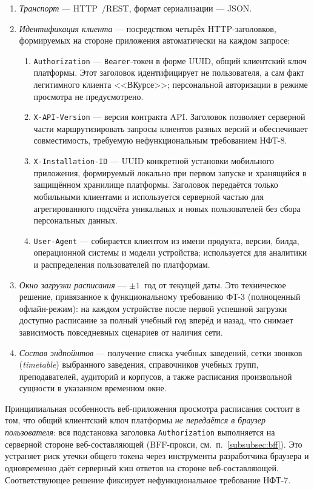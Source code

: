 \begin{enumerate}
  \item \emph{Транспорт} --- HTTP~\cite{rfc-9110}/REST, формат сериализации --- JSON.
  \item \emph{Идентификация клиента} --- посредством четырёх HTTP-заголовков, формируемых на стороне приложения автоматически на каждом запросе:
    \begin{enumerate}
      \item \texttt{Authorization} --- \texttt{Bearer}-токен в форме UUID, общий клиентский ключ платформы. Этот заголовок идентифицирует не пользователя, а сам факт легитимного клиента <<ВКурсе>>; персональной авторизации в режиме просмотра не предусмотрено.
      \item \texttt{X-API-Version} --- версия контракта API. Заголовок позволяет серверной части маршрутизировать запросы клиентов разных версий и обеспечивает совместимость, требуемую нефункциональным требованием НФТ-8.
      \item \texttt{X-Installation-ID} --- UUID конкретной установки мобильного приложения, формируемый локально при первом запуске и хранящийся в защищённом хранилище платформы. Заголовок передаётся только мобильными клиентами и используется серверной частью для агрегированного подсчёта уникальных и новых пользователей без сбора персональных данных.
      \item \texttt{User-Agent} --- собирается клиентом из имени продукта, версии, билда, операционной системы и модели устройства; используется для аналитики и распределения пользователей по платформам.
    \end{enumerate}
  \item \emph{Окно загрузки расписания} --- $\pm 1$~год от текущей даты. Это техническое решение, привязанное к функциональному требованию ФТ-3 (полноценный офлайн-режим): на каждом устройстве после первой успешной загрузки доступно расписание за полный учебный год вперёд и назад, что снимает зависимость повседневных сценариев от наличия сети.
  \item \emph{Состав эндпойнтов} --- получение списка учебных заведений, сетки звонков (\emph{timetable}) выбранного заведения, справочников учебных групп, преподавателей, аудиторий и корпусов, а также расписания произвольной сущности в указанном временном окне.
\end{enumerate}

Принципиальная особенность веб-приложения просмотра расписания состоит в том, что общий клиентский ключ платформы \emph{не передаётся в браузер пользователя}: вся подстановка заголовка \texttt{Authorization} выполняется на серверной стороне веб-составляющей (BFF-прокси, см.~п.~\ref{subsubsec:bff}). Это устраняет риск утечки общего токена через инструменты разработчика браузера и одновременно даёт серверный кэш ответов на стороне веб-составляющей. Соответствующее решение фиксирует нефункциональное требование НФТ-7.

